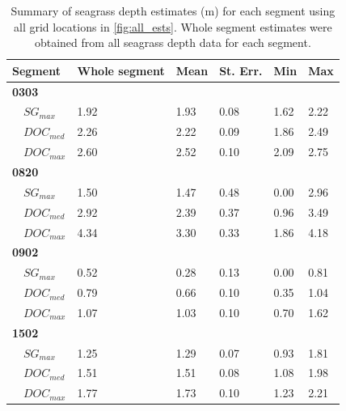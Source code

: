 \documentclass[letterpaper,12pt,oneside]{article}\usepackage[]{graphicx}\usepackage[]{color}
\begin{document}
\begin{table}[!tbp]
\caption{Summary of seagrass depth estimates (m) for each segment using all grid locations in \cref{fig:all_ests}.  Whole segment estimates were obtained from all seagrass depth data for each segment.\label{tab:est_summ}} 
\begin{center}
\begin{tabular}{llllll}
\hline\hline
\multicolumn{1}{l}{{\bf Segment}}&\multicolumn{1}{c}{Whole segment}&\multicolumn{1}{c}{Mean}&\multicolumn{1}{c}{St. Err.}&\multicolumn{1}{c}{Min}&\multicolumn{1}{c}{Max}\tabularnewline
\hline
{\bfseries 0303}&&&&&\tabularnewline
~~$SG_{max}$&1.92&1.93&0.08&1.62&2.22\tabularnewline
~~$DOC_{med}$&2.26&2.22&0.09&1.86&2.49\tabularnewline
~~$DOC_{max}$&2.60&2.52&0.10&2.09&2.75\tabularnewline
\hline
{\bfseries 0820}&&&&&\tabularnewline
~~$SG_{max}$&1.50&1.47&0.48&0.00&2.96\tabularnewline
~~$DOC_{med}$&2.92&2.39&0.37&0.96&3.49\tabularnewline
~~$DOC_{max}$&4.34&3.30&0.33&1.86&4.18\tabularnewline
\hline
{\bfseries 0902}&&&&&\tabularnewline
~~$SG_{max}$&0.52&0.28&0.13&0.00&0.81\tabularnewline
~~$DOC_{med}$&0.79&0.66&0.10&0.35&1.04\tabularnewline
~~$DOC_{max}$&1.07&1.03&0.10&0.70&1.62\tabularnewline
\hline
{\bfseries 1502}&&&&&\tabularnewline
~~$SG_{max}$&1.25&1.29&0.07&0.93&1.81\tabularnewline
~~$DOC_{med}$&1.51&1.51&0.08&1.08&1.98\tabularnewline
~~$DOC_{max}$&1.77&1.73&0.10&1.23&2.21\tabularnewline
\hline
\end{tabular}\end{center}

\end{table}


\clearpage

\end{document}
